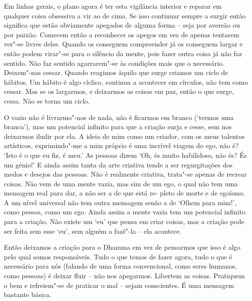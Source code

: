 Em linhas gerais, o plano agora é ter esta vigilância interior e reparar
em qualquer coisa obsessiva a vir ao de cima. Se isso continuar sempre a
surgir então significa que estão obviamente apegados de alguma forma --
seja por aversão ou por paixão. Comecem então a reconhecer os apegos em
vez de apenas tentarem ver"-se livres deles. Quando os conseguem
compreender já os conseguem largar e então podem virar"-se para o
silêncio da mente, pois fazer outra coisa já não faz sentido. Não faz
sentido agarrarem"-se às condições mais que o necessário. Deixem"-nas
cessar. Quando reagimos àquilo que surge criamos um ciclo de hábitos. Um
hábito é algo cíclico, continua a acontecer em círculos, não tem como
cessar. Mas se os largarmos, e deixarmos as coisas em paz, então o que
surge, cessa. Não se torna um ciclo.

O vazio não é livrarmo"-nos de nada, não é ficarmos em branco (`termos
uma branca'), mas um potencial infinito para que a criação surja e
cesse, sem nos deixarmos iludir por ela. A ideia de mim como um criador,
com os meus talentos artísticos, exprimindo"-me a mim próprio é uma
incrível viagem do ego, não é? `Isto é o que eu fiz, é meu.' As pessoas
dizem `Oh, és muito habilidoso, não és? És um génio!' E ainda assim
tanta da arte criativa tende a ser regurgitações dos medos e desejos das
pessoas. Não é realmente criativa, trata"-se apenas de recrear coisas.
Não vem de uma mente vazia, mas sim de um ego, o qual não tem uma
mensagem real para dar, a não ser a de que está re- pleto de morte e de
egoísmo. A um nível universal não tem outra mensagem senão a de `Olhem
para mim!', como pessoa, como um ego. Ainda assim a mente vazia tem um
potencial infinito para a criação. Não existe um `eu' que pensa em criar
coisas, mas a criação pode ser feita sem esse `eu', sem alguém a fazê"-la
-- ela acontece.

Então deixamos a criação para o Dhamma em vez de pensarmos que isso é
algo pelo qual somos responsáveis. Tudo o que temos de fazer agora, tudo
o que é necessário para nós (falando de uma forma convencional, como
seres humanos, como pessoas) é deixar fluir -- não nos apegarmos.
Libertem as coisas. Pratiquem o bem e refreiem"-se de praticar o mal --
sejam conscientes. É uma mensagem bastante básica.

